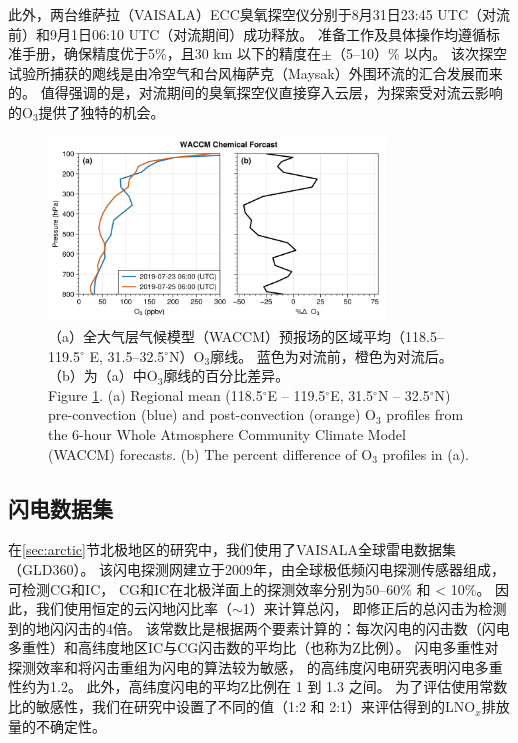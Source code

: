 此外，两台维萨拉（VAISALA）ECC臭氧探空仪分别于8月31日23:45 UTC（对流前）和9月1日06:10 UTC（对流期间）成功释放。
准备工作及具体操作均遵循标准手册，确保精度优于5\%，且30 km 以下的精度在$\pm$（5--10）\% 以内\citep{Smit.2007}。
该次探空试验所捕获的飑线是由冷空气和台风梅萨克（Maysak）外围环流的汇合发展而来的。
值得强调的是，对流期间的臭氧探空仪直接穿入云层，为探索受对流云影响的O$_3$提供了独特的机会。

\begin{figure}[H]
\centering
\includegraphics[width=0.8\textwidth]{./figures/waccm_forcast_o3.png}
\caption{（a）全大气层气候模型（WACCM）预报场的区域平均（118.5--119.5$^{\circ}$ E, 31.5--32.5$^{\circ}$N）O$_3$廓线。
蓝色为对流前，橙色为对流后。（b）为（a）中O$_3$廓线的百分比差异。\\
Figure \ref{fig:waccm_forcast_o3}. (a) Regional mean (118.5$^{\circ}$E – 119.5$^{\circ}$E, 31.5$^{\circ}$N – 32.5$^{\circ}$N)
pre-convection (blue) and post-convection (orange) O$_3$ profiles from the 6-hour Whole Atmosphere Community Climate Model (WACCM) forecasts.
(b) The percent difference of O$_3$ profiles in (a).
}
\label{fig:waccm_forcast_o3}
\end{figure}

\subsection{闪电数据集}

在\ref{sec:arctic}节北极地区的研究中，我们使用了VAISALA全球雷电数据集（GLD360）。
该闪电探测网建立于2009年，由全球极低频闪电探测传感器组成，可检测CG和IC\citep{Said.2010,Said.2013,Said.2017}，
CG和IC在北极洋面上的探测效率分别为50--60\% 和 < 10\%\citep{Vagasky.2022}。
因此，我们使用恒定的云闪地闪比率（$\sim$1）来计算总闪，
即修正后的总闪击为检测到的地闪闪击的4倍\citep{Mackerras.1994,Prentice.1977}。
该常数比是根据两个要素计算的：每次闪电的闪击数（闪电多重性）和高纬度地区IC与CG闪击数的平均比（也称为Z比例）。
闪电多重性对探测效率和将闪击重组为闪电的算法较为敏感\citep{Schulz.2005,Yair.2014,Burgesser.2017,Kolmasova.2022}，
\citet{Yusop.2019}的高纬度闪电研究表明闪电多重性约为1.2。
此外，高纬度闪电的平均Z比例在 1 到 1.3 之间\citep{Mackerras.1994,Prentice.1977,Bandholnopparat.2020}。
为了评估使用常数比的敏感性，我们在研究中设置了不同的值（1:2 和 2:1）来评估得到的LNO$_x$排放量的不确定性。


